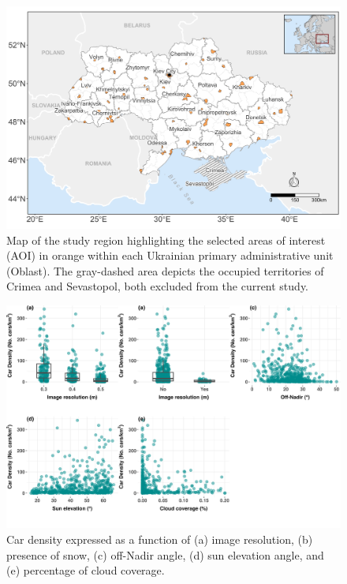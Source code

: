 \documentclass[sn-basic]{sn-jnl}%
\begin{document}
{%
\begin{figure}[hbtp]
\begin{center}
\includegraphics[width=\textwidth]{Figures/map2.jpg}
\end{center}
\caption{Map of the study region highlighting the selected areas of interest (AOI) in orange within each Ukrainian primary administrative unit (Oblast). The gray-dashed area depicts the occupied territories of Crimea and Sevastopol, both excluded from the current study.}\label{Fig_map}
\end{figure}


\begin{figure}[hbtp]
\begin{center}
\includegraphics[width=\textwidth]{Figures/covariates.jpg}
\end{center}
\caption{Car density expressed as a function of (a) image resolution, (b) presence of snow, (c) off-Nadir angle, (d) sun elevation angle, and (e) percentage of cloud coverage.}\label{Fig_covariates}
\end{figure}


}
\end{document}
